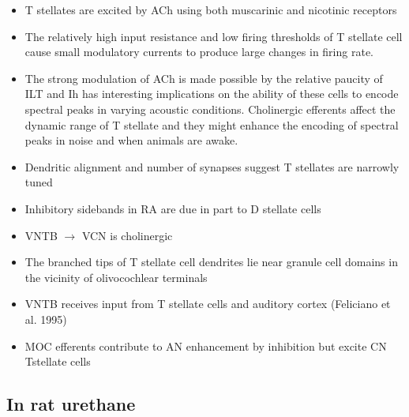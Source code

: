 \documentclass[10pt,a4paper]{article}
\begin{document}
\begin{itemize}
\item T stellates are excited by ACh using both muscarinic and nicotinic
  receptors
\item The relatively high input resistance and low firing thresholds of T
  stellate cell cause small modulatory currents to produce large changes in
  firing rate.
\item The strong modulation of ACh is made possible by the relative paucity of
  ILT and Ih has interesting implications on the ability of these cells to
  encode spectral peaks in varying acoustic conditions.  Cholinergic efferents
  affect the dynamic range of T stellate and they might enhance the encoding of
  spectral peaks in noise and when animals are awake.
\item Dendritic alignment and number of synapses suggest T stellates are
  narrowly tuned
\item Inhibitory sidebands in RA are due in part to D stellate cells
\item VNTB \ensuremath{\rightarrow} VCN is cholinergic  \citep{SherriffHenderson:1994}
\item The branched tips of T stellate cell dendrites lie near granule cell
  domains in the vicinity of olivocochlear terminals
  \citep{OertelFujino:2001,OertelWuEtAl:1990}
\item VNTB receives input from T stellate cells
  \citep{SmithJorisEtAl:1993,ThompsonThompson:1991} and auditory cortex
  (Feliciano et al. 1995)
\item MOC efferents contribute to AN enhancement by inhibition but excite CN
  Tstellate cells
\end{itemize}


\subsection{In rat urethane \citep{EbertOstwald:1995}}
\end{document}
